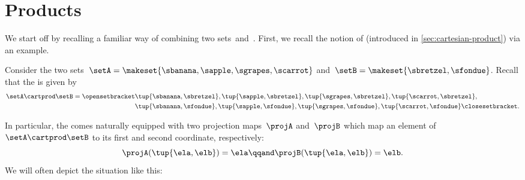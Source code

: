 
\section{Products}
\label{sec:products}



We start off by recalling a familiar way of combining two sets~\setA and~\setB.
First, we recall the notion of \emph{} (introduced in \cref{sec:cartesian-product}) via an example.

\begin{example}
    Consider the two sets~$\setA = \makeset{\sbanana, \sapple, \sgrapes, \scarrot}$ and~$\setB = \makeset{ \sbretzel, \sfondue }$.
    Recall that the  is given by
    \begin{equation}
        \label{eq:cart-prod-example}
        \begin{aligned}
            \setA \cartprod \setB = \opensetbracket & \tup{\sbanana, \sbretzel}, \tup{\sapple, \sbretzel}, \tup{\sgrapes, \sbretzel}, \tup{\scarrot, \sbretzel}, \\
                                                    & \tup{\sbanana,\sfondue}, \tup{\sapple, \sfondue}, \tup{\sgrapes, \sfondue}, \tup{\scarrot, \sfondue} \closesetbracket.
        \end{aligned}
    \end{equation}

    In particular, the  comes naturally equipped with two projection maps~$\projA$ and~$\projB$ which map an element of~$\setA \cartprod \setB$ to its first and second coordinate, respectively:
    \begin{equation}\label{eq:cart-prod-projection-map-defs}
        \projA(\tup{\ela,\elb}) = \ela \qqand \projB(\tup{\ela,\elb}) = \elb.
    \end{equation}
    We will often depict the situation like this:
\end{example}

